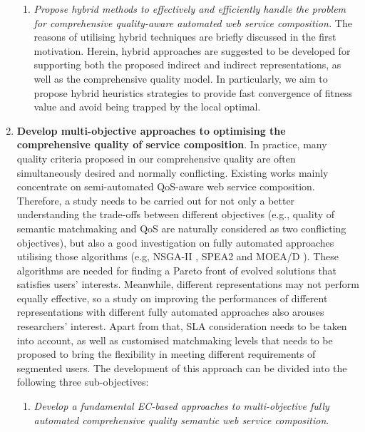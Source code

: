 \begin{enumerate}
\begin{enumerate}
    \item \emph{Propose hybrid methods to effectively and efficiently handle the problem for comprehensive quality-aware automated web service composition.} The reasons of utilising hybrid techniques are briefly discussed in the first motivation. Herein, hybrid approaches are suggested to be developed for supporting both the proposed indirect and indirect representations, as well as the comprehensive quality model. In particularly, we aim to propose hybrid heuristics strategies to provide fast convergence of fitness value and avoid being trapped by the local optimal.
  \end{enumerate}
 
 \item \label{Obj:2} \textbf{Develop multi-objective approaches to optimising the comprehensive quality of service composition}. In practice, many quality criteria proposed in our comprehensive quality are often simultaneously desired and normally conflicting. Existing works \cite{chen2014partial,xiang2014qos,yin2014hybrid,liu2005dynamic,yu2013efficient,zhang2010qos} mainly concentrate on semi-automated QoS-aware web service composition. Therefore, a study needs to be carried out for not only a better understanding the trade-offs between different objectives (e.g., quality of semantic matchmaking and QoS are naturally considered as two conflicting objectives), but also a good investigation on fully automated approaches utilising those algorithms (e.g, NSGA-II \cite{deb2002fast}, SPEA2 \cite{zitzler2001spea2} and MOEA/D \cite{zhang2007moea}). These algorithms are needed for finding a Pareto front of evolved solutions that satisfies users' interests. Meanwhile, different representations may not perform equally effective, so a study on improving the performances of different representations with different fully automated approaches also arouses researchers' interest. Apart from that, SLA consideration needs to be taken into account, as well as customised matchmaking levels that needs to be proposed to bring the flexibility in meeting different requirements of segmented users. The development of this approach can be divided into the following three sub-objectives:
   \begin{enumerate}
   
    \item \label{Obj:2.1} \emph{Develop a fundamental EC-based approaches to multi-objective fully automated comprehensive quality semantic web service composition}. 
    

\end{enumerate}
\end{enumerate}
